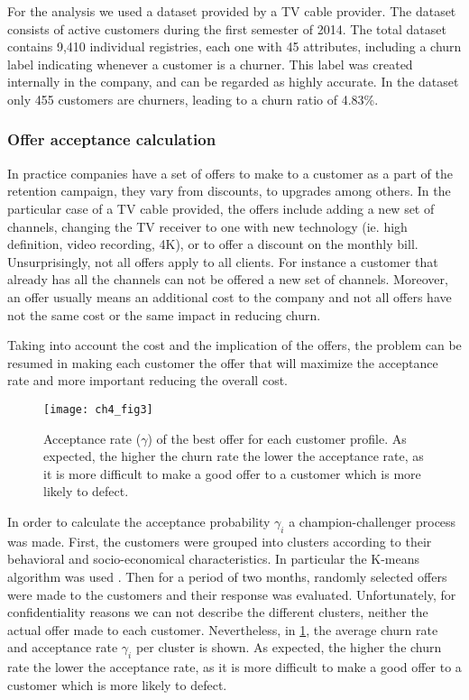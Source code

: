 For the analysis we used a dataset provided by a TV cable provider. 
The dataset consists of active customers during the first semester of 2014. 	
The total dataset contains 9,410 individual registries, each one with 45 attributes, 
including a churn label indicating whenever a customer is a churner.
This label was created internally in the company, and can be regarded as highly accurate. 
In the dataset only 455 customers are churners, leading to a churn ratio of 4.83\%.
	
\subsubsection{Offer acceptance calculation}

In practice companies have a set of offers to make to a customer as a part of the retention 
campaign, they vary from discounts, to upgrades among others. In the particular case of a TV cable 
provided, the offers include adding a new set of channels, changing the TV receiver to one with new 
technology (ie. high definition, video recording, 4K),  or to offer a discount on the monthly bill.
Unsurprisingly, not all offers apply to all clients. For instance a customer that already has all 
the channels can not be offered a new set of channels. Moreover, an offer usually means an 
additional cost to the company and not all offers have not the same cost or the same impact in 
reducing churn.

Taking into account the cost and the implication of the offers, the problem can be 
resumed in making each customer the offer that will maximize the acceptance rate and more 
important reducing the overall cost. 

\begin{figure}[t!]
  \centering
   \texttt{[image: ch4\_fig3]}
  \caption{Acceptance rate ($\gamma$) of the best offer for each customer profile. As expected, 
	the higher the churn rate the lower the acceptance rate, as it is more difficult to make a 
	good offer to a customer which is more likely to defect. }
  \label{fig:ch4:3}
\end{figure}

In order to calculate the acceptance probability $\gamma_i$ a champion-challenger process was made. 
First, the customers were grouped into clusters according to their behavioral and socio-economical 
characteristics. In particular the K-means algorithm was used \citep{Marslan2009}.
Then for a period of two months, randomly selected offers were made to the customers and their 
response was evaluated. Unfortunately, for confidentiality reasons we can not describe the 
different clusters, neither the actual offer made to each customer. Nevertheless, in \figurename{ 
\ref{fig:ch4:3}}, the average churn rate and acceptance rate $\gamma_i$ per cluster is shown. As 
expected, the higher the churn rate the lower the acceptance rate, as it is more difficult to make a 
good offer to a customer which is more likely to defect.


